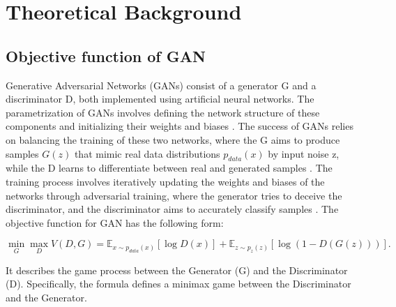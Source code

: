 \chapter{Theoretical Background}
\label{Theoretical Background for GAN}

\section{Objective function of GAN}

Generative Adversarial Networks (GANs) consist of a generator G and a discriminator D, 
both implemented using artificial neural networks. The parametrization of GANs involves 
defining the network structure of these components and initializing their weights and biases \citep{10.1007/s10928-021-09787-4}. 
The success of GANs relies on balancing the training of these two networks, where the 
G aims to produce samples $G(z)$ that mimic real data distributions $p_{data}(x)$ by input noise z, while the D 
learns to differentiate between real and generated samples \citep{10.1109/taslp.2017.2761547}. 
The training process involves iteratively updating the weights and biases of the networks through 
adversarial training, where the generator tries to deceive the discriminator, and the discriminator 
aims to accurately classify samples \citep{10.48550/arxiv.1802.05637}.
The objective function for GAN has the following form:

\begin{equation}
    \label{eq:min & max}
    \min_{G} \max_{D} V(D, G) = \mathbb{E}_{x \sim p_{data}(x)} [\log D(x)] + \mathbb{E}_{z \sim p_{z}(z)} [\log(1 - D(G(z)))].
\end{equation}



It describes the game process between the Generator (G) and the Discriminator (D). Specifically, the formula defines a minimax game between the Discriminator and the Generator.

